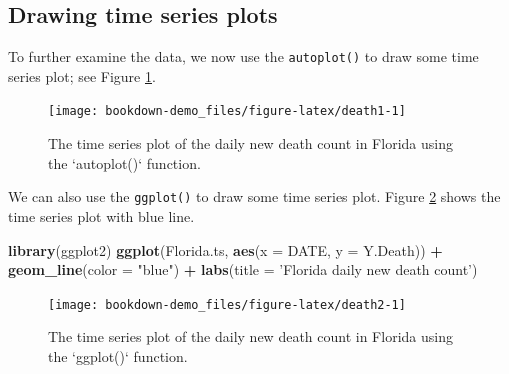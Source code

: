 \documentclass[]{book}
\newenvironment{Shaded}{\begin{snugshade}}{\end{snugshade}}
\newcommand{\KeywordTok}[1]{\textcolor[rgb]{0.13,0.29,0.53}{\textbf{#1}}}
\newcommand{\DataTypeTok}[1]{\textcolor[rgb]{0.13,0.29,0.53}{#1}}
\newcommand{\StringTok}[1]{\textcolor[rgb]{0.31,0.60,0.02}{#1}}
\newcommand{\OperatorTok}[1]{\textcolor[rgb]{0.81,0.36,0.00}{\textbf{#1}}}
\newcommand{\NormalTok}[1]{#1}
\begin{document}
\subsection{Drawing time series plots}\label{drawing-time-series-plots}

To further examine the data, we now use the \texttt{autoplot()} to draw
some time series plot; see Figure \ref{fig:death1}.

\begin{Shaded}
\end{Shaded}

\begin{figure}

{\centering \texttt{[image: bookdown-demo\_files/figure-latex/death1-1]} 

}

\caption{The time series plot of the daily new death count in Florida using the `autoplot()` function.}\label{fig:death1}
\end{figure}

We can also use the \texttt{ggplot()} to draw some time series plot.
Figure \ref{fig:death2} shows the time series plot with blue line.

\begin{Shaded}
\begin{Highlighting}[]
\KeywordTok{library}\NormalTok{(ggplot2)}
\KeywordTok{ggplot}\NormalTok{(Florida.ts, }\KeywordTok{aes}\NormalTok{(}\DataTypeTok{x =}\NormalTok{ DATE, }\DataTypeTok{y =}\NormalTok{ Y.Death)) }\OperatorTok{+}\StringTok{ }
\StringTok{  }\KeywordTok{geom_line}\NormalTok{(}\DataTypeTok{color =} \StringTok{"blue"}\NormalTok{) }\OperatorTok{+}\StringTok{ }
\StringTok{  }\KeywordTok{labs}\NormalTok{(}\DataTypeTok{title =} \StringTok{'Florida daily new death count'}\NormalTok{) }
\end{Highlighting}
\end{Shaded}

\begin{figure}

{\centering \texttt{[image: bookdown-demo\_files/figure-latex/death2-1]} 

}

\caption{The time series plot of the daily new death count in Florida using the `ggplot()` function.}\label{fig:death2}
\end{figure}
\end{document}
